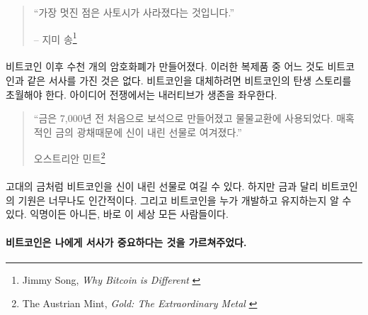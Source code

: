 \begin{quotation}\begin{samepage}
		\enquote{가장 멋진 점은 사토시가 사라졌다는 것입니다.}
		\begin{flushright} -- 지미 송\footnote{Jimmy Song, \textit{Why Bitcoin is Different} \cite{bitcoin-different}}
\end{flushright}\end{samepage}\end{quotation}

\newpage

\paragraph{}
비트코인 이후 수천 개의 암호화폐가 만들어졌다. 
이러한 복제품 중 어느 것도 비트코인과 같은 서사를 가진 것은 없다.
비트코인을 대체하려면 비트코인의 탄생 스토리를 초월해야 한다. 
아이디어 전쟁에서는 내러티브가 생존을 좌우한다.

\begin{quotation}\begin{samepage}
		\enquote{금은 7,000년 전 처음으로 보석으로 만들어졌고 물물교환에 사용되었다. 매혹적인 금의 광채때문에 신이 내린 선물로 여겨졌다.}
		\begin{flushright} 오스트리안 민트\footnote{The Austrian Mint, \textit{Gold: The Extraordinary Metal} \cite{gold-gift-gods}}
\end{flushright}\end{samepage}\end{quotation}

\paragraph{}
고대의 금처럼 비트코인을 신이 내린 선물로 여길 수 있다. 
하지만 금과 달리 비트코인의 기원은 너무나도 인간적이다. 
그리고 비트코인을 누가 개발하고 유지하는지 알 수 있다.
익명이든 아니든, 바로 이 세상 모든 사람들이다.

\paragraph{비트코인은 나에게 서사가 중요하다는 것을 가르쳐주었다.}

%
%
%
%
